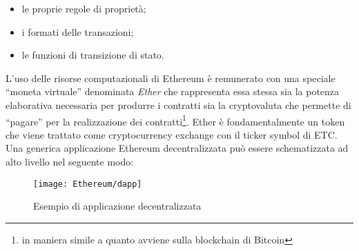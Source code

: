 \begin{itemize}
	\item le proprie regole di proprietà;
	\item i formati delle transazioni;
	\item le funzioni di transizione di stato.
\end{itemize}%
L’uso delle risorse computazionali di Ethereum è remunerato con una speciale “moneta virtuale” denominata \emph{Ether} che rappresenta essa stessa sia la potenza elaborativa necessaria per produrre i contratti sia la cryptovaluta che permette di “pagare” per la realizzazione dei contratti\footnote{in maniera simile a quanto avviene sulla blockchain di Bitcoin}. Ether è fondamentalmente un token che viene trattato come cryptocurrency exchange con il ticker symbol di ETC. \\
Una generica applicazione Ethereum decentralizzata può essere schematizzata ad alto livello nel seguente modo: 
\begin{center}%
	\begin{figure}[H]
		\centering
		\texttt{[image: Ethereum/dapp]}
		\caption{Esempio di applicazione decentralizzata}
		\label{fig:esempio di dapp}
	\end{figure}
\end{center}%
